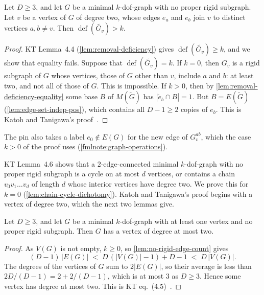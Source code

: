\begin{lemma}
  \label{lem:removal-deficiency-strict}
  \leanok
  Let $D \ge 3$, and let $G$ be a minimal $k$-dof-graph with no proper
  rigid subgraph. Let $v$ be a vertex of $G$ of degree two, whose edges
  $e_a$ and $e_b$ join $v$ to distinct vertices $a, b \neq v$. Then
  $\operatorname{def}(\widetilde{G_v}) > k$.
\end{lemma}
\begin{proof}
  \leanok
  KT Lemma~4.4 (\cref{lem:removal-deficiency}) gives
  $\operatorname{def}(\widetilde{G_v}) \ge k$, and we show that
  equality fails. Suppose that $\operatorname{def}(\widetilde{G_v}) = k$.
  If $k = 0$, then $G_v$ is a rigid subgraph of $G$ whose vertices, those
  of $G$ other than $v$, include $a$ and $b$: at least two, and not all
  of those of $G$. This is impossible. If $k > 0$, then by
  \cref{lem:removal-deficiency-equality} some base $B$ of $M(\tilde G)$
  has $|\tilde e_b \cap B| = 1$. But
  $B = E(\tilde G)$ (\cref{lem:edge-set-indep-pos}), which contains all
  $D - 1 \ge 2$ copies of $e_b$. This is Katoh and Tanigawa's
  proof~\cite[p.~665]{katohTanigawa2011}.
\end{proof}
\begin{fmlnote}
  The pin also takes a label $e_0 \notin E(G)$ for the new edge of
  $G_v^{ab}$, which the case $k > 0$ of the proof uses
  (\cref{fmlnote:graph-operations}).
\end{fmlnote}

KT Lemma~4.6 shows that a $2$-edge-connected minimal $k$-dof-graph with
no proper rigid subgraph is a cycle on at most $d$ vertices, or contains
a chain $v_0 v_1 \dots v_d$ of length $d$ whose interior vertices have
degree two. We prove this for $k = 0$ (\cref{lem:chain-cycle-dichotomy}).
Katoh and Tanigawa's proof begins with a vertex of degree two, which the
next two lemmas give.

\begin{lemma}
  \label{lem:low-degree-vertex}
  \leanok
  Let $D \ge 3$, and let $G$ be a minimal $k$-dof-graph with at least one
  vertex and no proper rigid subgraph. Then $G$ has a vertex of degree at
  most two.
\end{lemma}
\begin{proof}
  \leanok
  As $V(G)$ is not empty, $k \ge 0$, so \cref{lem:no-rigid-edge-count}
  gives
  \[
    (D-1)\,|E(G)| \;<\; D\,(|V(G)| - 1) + D - 1 \;<\; D\,|V(G)|.
  \]
  The degrees of the vertices of $G$ sum to $2|E(G)|$, so their average
  is less than $2D/(D-1) = 2 + 2/(D-1)$, which is at most $3$ as
  $D \ge 3$. Hence some vertex has degree at most two. This is KT
  eq.~(4.5)~\cite[p.~664]{katohTanigawa2011}.
\end{proof}

